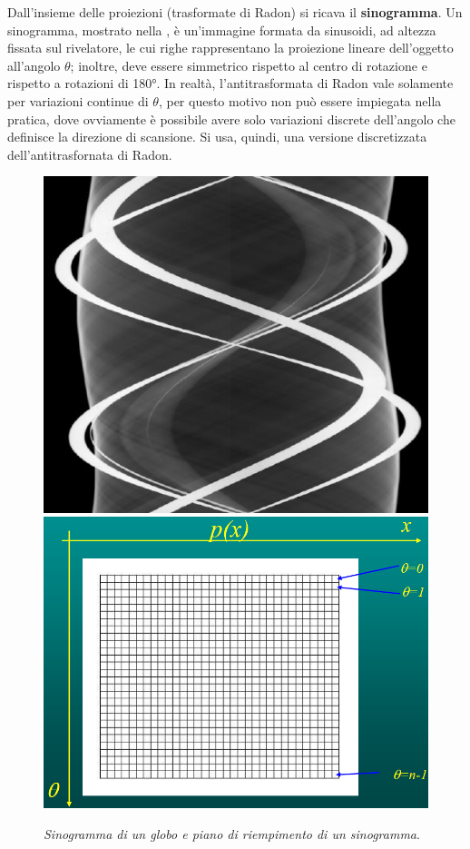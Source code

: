 Dall'insieme delle proiezioni (trasformate di Radon) si ricava il \textbf{sinogramma}. Un sinogramma, mostrato nella , è un’immagine formata da sinusoidi, ad altezza fissata sul rivelatore, le cui righe rappresentano la proiezione lineare dell'oggetto all'angolo $\theta$; inoltre, deve essere simmetrico rispetto al centro di rotazione e rispetto a rotazioni di 180°. In realtà, l'antitrasformata di Radon vale solamente per variazioni continue di $\theta$, per questo motivo non può essere impiegata nella pratica, dove ovviamente è possibile avere solo variazioni discrete dell'angolo che definisce la direzione di scansione. Si usa, quindi, una versione discretizzata dell'antitrasfornata di Radon.

\begin{figure}[htp]
\centering
\includegraphics[scale=0.64]{Immagini/sinogramma.png}\quad\includegraphics[scale=0.38]{Immagini/sino.png}
\caption{\label{fig:sino} \textit{Sinogramma di un globo e piano di riempimento di un sinogramma}.}
\end{figure}

